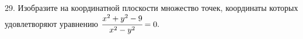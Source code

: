 29. Изобразите на координатной плоскости множество точек, координаты которых удовлетворяют уравнению $\cfrac{x^2+y^2-9}{x^2-y^2}=0.$\\
